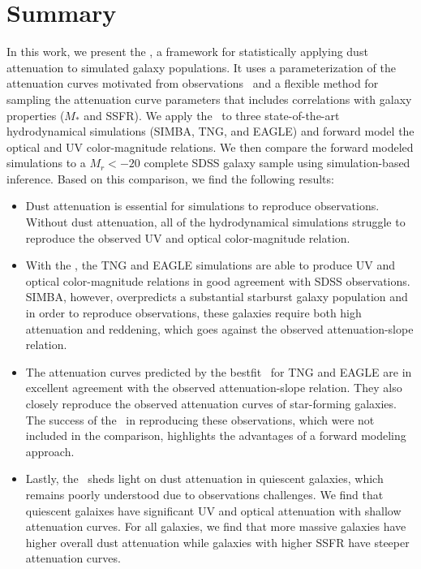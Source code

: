 \section{Summary}
In this work, we present the \eda, a framework for statistically applying dust
attenuation to simulated galaxy populations. It uses a parameterization of 
the attenuation curves motivated from observations~\citep{noll2009} and a
flexible method for sampling the attenuation curve parameters that includes
correlations with galaxy properties ($M_*$ and SSFR). We apply the \eda~to 
three state-of-the-art hydrodynamical simulations (SIMBA, TNG, and EAGLE) and
forward model the optical and UV color-magnitude relations. We then compare
the forward modeled simulations to a $M_r < -20$ complete SDSS galaxy sample  
using simulation-based inference. Based on this comparison, we find the
following results: 

\begin{itemize}
    \item Dust attenuation is essential for simulations to reproduce observations.
        Without dust attenuation, all of the hydrodynamical simulations struggle
        to reproduce the observed UV and optical color-magnitude relation. 
    \item With the \eda, the TNG and EAGLE simulations are able to produce UV and
        optical color-magnitude relations in good agreement with SDSS observations. 
        SIMBA, however, overpredicts a substantial starburst galaxy population
        and in order to reproduce observations, these galaxies require
        both high attenuation and reddening, which goes against the observed 
        attenuation-slope relation. 
    \item The attenuation curves predicted by the bestfit \eda~for TNG and
        EAGLE are in excellent agreement with the observed attenuation-slope
        relation. They also closely reproduce the observed attenuation curves
        of star-forming galaxies. The success of the \eda~in reproducing these
        observations, which were not included in the comparison, highlights the 
        advantages of a forward modeling approach. 
    \item Lastly, the \eda~sheds light on dust attenuation in quiescent
        galaxies, which remains poorly understood due to observations
        challenges. We find that quiescent galaixes have significant UV and
        optical attenuation with shallow attenuation curves. For all galaxies, 
        we find that more massive galaxies have higher overall dust
        attenuation while galaxies with higher SSFR have steeper attenuation
        curves. 
\end{itemize}

